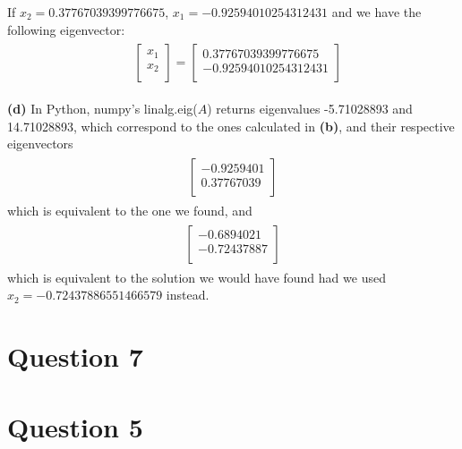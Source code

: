 \documentclass[leqno]{article}
\begin{document}
If $x_2 = 0.37767039399776675$, $x_1 = -0.92594010254312431$ and we have the following eigenvector:
\begin{gather*}
\begin{split}
&\begin{bmatrix}
    x_1 \\
    x_2  \\
\end{bmatrix} =
\begin{bmatrix} 
   0.37767039399776675\\
   -0.92594010254312431\\
\end{bmatrix}
\end{split}
\end{gather*}

\noindent \textbf{(d)} In Python, numpy's linalg.eig($A$) returns eigenvalues -5.71028893 and  14.71028893,
which correspond to the ones calculated in \textbf{(b)}, and their respective eigenvectors
\begin{gather*}
\begin{split}
\begin{bmatrix} 
   -0.9259401\\
   0.37767039\\
\end{bmatrix}
\end{split}
\end{gather*}
which is equivalent to the one we found, and
\begin{gather*}
\begin{split}
\begin{bmatrix} 
   -0.6894021\\
   -0.72437887\\
\end{bmatrix}
\end{split}
\end{gather*}
which is equivalent to the solution we would have found had we used $x_2 = -0.72437886551466579$ instead.


\hfill

\section*{Question 7}

\hfill

\section*{Question 5}

\hfill
   
\end{document}
